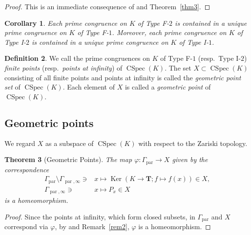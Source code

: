 \documentclass[a4paper,12pt]{amsart}
\theoremstyle{plain}
\newtheorem{theorem}{Theorem}[section]
\newtheorem{corollary}[theorem]{Corollary}
\theoremstyle{definition}
\newtheorem{definition}[theorem]{Definition}
\begin{document}
\begin{proof}
This is an immediate consequence of \cite[Proposition~4.6]{JuAe7} and Theorem~\ref{thm3}.
\end{proof}

\begin{corollary}
    \label{cor3}
Each prime congruence on $K$ of Type F-$2$ is contained in a unique prime congruence on $K$ of Type F-$1$.
Moreover, each prime congruence on $K$ of Type I-$2$ is contained in a unique prime congruence on $K$ of Type I-$1$.
\end{corollary}

\begin{definition}
    \label{dfn4}
We call the prime congruences on $K$ of Type F-$1$ (resp.~Type I-$2$) \textit{finite points} (resp.~\textit{points at infinity}) of $\operatorname{CSpec}(K)$.
The set $X \subset \operatorname{CSpec}(K)$ consisting of all finite points and points at infinity is called the \textit{geometric point set} of $\operatorname{CSpec}(K)$.
Each element of $X$ is called a \textit{geometric point} of $\operatorname{CSpec}(K)$.    
\end{definition}

\subsection{Geometric points}
    \label{subsection5.3}

We regard $X$ as a subspace of $\operatorname{CSpec}(K)$ with respect to the Zariski topology.

\begin{theorem}[Geometric Points]
    \label{thm5}
The map $\varphi : \varGamma_{\operatorname{par}} \to X$ given by the correspondence
\begin{align*}
\varGamma_{\operatorname{par}} \setminus \varGamma_{\operatorname{par}, \infty} \ni &x \mapsto \operatorname{Ker}(K \to \boldsymbol{T}; f \mapsto f(x)) \in X,\\
\varGamma_{\operatorname{par}, \infty} \ni &x \mapsto P_x \in X
\end{align*}
is a homeomorphism.
\end{theorem}

\begin{proof}
Since the points at infinity, which form closed subsets, in $\varGamma_{\operatorname{par}}$ and $X$ correspond via $\varphi$, by \cite[Proposition~4.6]{JuAe7} and Remark~\ref{rem2}, $\varphi$ is a homeomorphism.
\end{proof}
\end{document}
